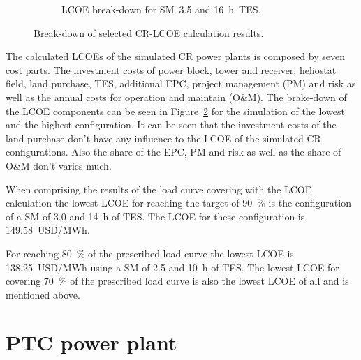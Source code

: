 \begin{figure}[!htbp]
\begin{subfigure}[b]{0.5\textwidth}
                \caption{LCOE break-down for SM~3.5 and 16~h~TES.}\label{CR_LCOE_highinvest_BreakDown}
        \end{subfigure}
        \caption[Break-down of selected CR-LCOE calculation results.]{Break-down of selected CR-LCOE calculation results.}\label{CR_LCOE_BreakDown}
\end{figure}
The calculated LCOEs of the simulated CR power plants is composed by seven cost parts. The investment costs of power block, tower and receiver, heliostat field, land purchase, TES, additional EPC, project management (PM) and risk as well as the annual costs for operation and maintain (O\&M). The brake-down of the LCOE components can be seen in Figure~\ref{CR_LCOE_BreakDown} for the simulation of the lowest and the highest configuration.  It can be seen that the investment costs of the land purchase don't have any influence to the LCOE of the simulated CR configurations. Also the share of the EPC, PM and risk as well as the share of O\&M don't varies much.

When comprising the results of the load curve covering with the LCOE calculation the lowest LCOE for reaching the target of 90~\% is the configuration of a SM of 3.0 and 14~h of TES. The LCOE for these configuration is 149.58~USD/MWh. 

For reaching 80~\% of the prescribed load curve the lowest LCOE is 138.25~USD/MWh using a SM of 2.5 and 10~h of TES. The lowest LCOE for covering 70~\% of the prescribed load curve is also the lowest LCOE of all and is mentioned above.

\pagebreak
\section{PTC power plant}
